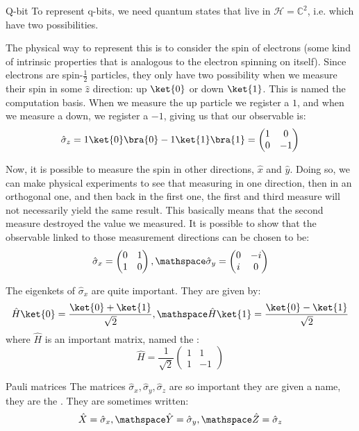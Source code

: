 \documentclass[a4paper]{article}
\begin{document}
\begin{parag}{Q-bit}
    To represent q-bits, we need quantum states that live in $\mathcal{H} = \mathbb{C}^2$, i.e. which have two possibilities.

    The physical way to represent this is to consider the spin of electrons (some kind of intrinsic properties that is analogous to the electron spinning on itself). Since electrons are spin-$\frac{1}{2}$ particles, they only have two possibility when we measure their spin in some $\hat{z}$ direction: up $\ket{0}$ or down $\ket{1}$. This is named the computation basis. When we measure the up particle we register a $1$, and when we measure a down, we register a $-1$, giving us   that our observable is:
    \[\hat{\sigma}_z = 1 \ket{0}\bra{0} -1 \ket{1}\bra{1} = \begin{pmatrix} 1 & 0 \\ 0 & -1 \end{pmatrix}\]

    Now, it is possible to measure the spin in other directions, $\hat{x}$ and $\hat{y}$. Doing so, we can make physical experiments to see that measuring in one direction, then in an orthogonal one, and then back in the first one, the first and third measure will not necessarily yield the same result. This basically means that the second measure destroyed the value we measured. It is possible to show that the observable linked to those measurement directions can be chosen to be: 
    \[\hat{\sigma}_x = \begin{pmatrix} 0 & 1 \\ 1 & 0 \end{pmatrix} , \mathspace \hat{\sigma}_y = \begin{pmatrix} 0 & -i \\ i & 0 \end{pmatrix} \]

    The eigenkets of $\hat{\sigma}_x$ are quite important. They are given by: 
    \[\hat{H}\ket{0} = \frac{\ket{0} + \ket{1}}{\sqrt{2}}, \mathspace \hat{H}\ket{1} = \frac{\ket{0} - \ket{1}}{\sqrt{2}}\]
    where $\hat{H}$ is an important matrix, named the : 
    \[\hat{H} = \frac{1}{\sqrt{2}} \begin{pmatrix} 1 & 1 \\ 1 & -1 \end{pmatrix} \]

    \begin{subparag}{Pauli matrices}
        The matrices $\hat{\sigma}_x, \hat{\sigma}_y, \hat{\sigma}_z$ are so important they are given a name, they are the . They are sometimes written: 
        \[\hat{X} = \hat{\sigma}_x, \mathspace \hat{Y} = \hat{\sigma}_y, \mathspace \hat{Z} = \hat{\sigma}_z\]


\end{subparag}
\end{parag}
\end{document}
